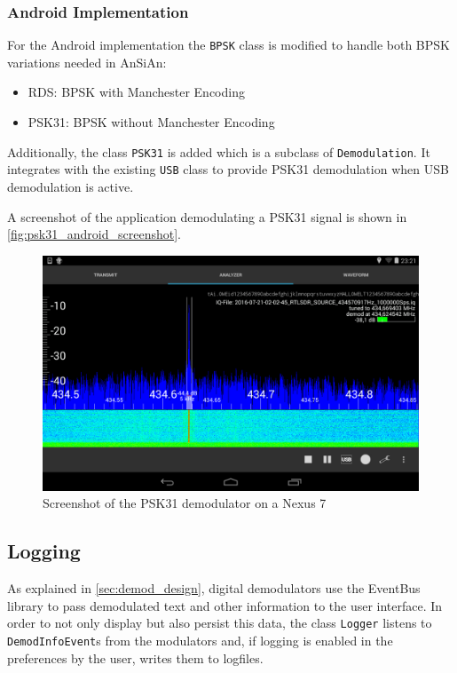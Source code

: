 \subsubsection{Android Implementation}

For the Android implementation the \texttt{BPSK} class is modified to handle both
\ac{BPSK} variations needed in \ac{AnSiAn}:
\begin{itemize}
	\item RDS: BPSK with Manchester Encoding
	\item PSK31: BPSK without Manchester Encoding
\end{itemize}

Additionally, the class \texttt{PSK31} is added which is a subclass of \texttt{Demodulation}.
It integrates with the existing \texttt{USB} class to provide PSK31 demodulation
when USB demodulation is active.

A screenshot of the application demodulating a \ac{PSK31} signal is shown in 
\autoref{fig:psk31_android_screenshot}.

\begin{figure}
	\centering
	\includegraphics[width=1\linewidth]{gfx/psk31/psk31_android_screenshot.png}
	\caption{Screenshot of the PSK31 demodulator on a Nexus 7}
	\label{fig:psk31_android_screenshot}
\end{figure}

\subsection{Logging\label{sec:logging}}

As explained in \autoref{sec:demod_design}, digital demodulators use the EventBus library to pass demodulated text and other information to the user interface. In order to not only display but also persist this data, the class \texttt{Logger} listens to \texttt{DemodInfoEvent}s from the modulators and, if logging is enabled in the preferences by the user, writes them to logfiles.

